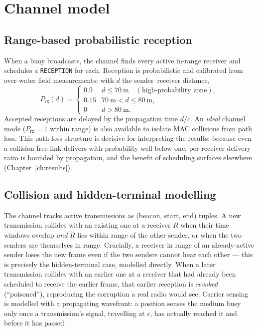 \documentclass[12pt,a4paper,oneside]{report}
\begin{document}
\section{Channel model}
\label{sec:collmodel}
\subsection{Range-based probabilistic reception}
When a buoy broadcasts, the channel finds every active in-range receiver and
schedules a \texttt{RECEPTION} for each. Reception is probabilistic and
calibrated from over-water field measurements: with $d$ the sender--receiver
distance,
\begin{equation}
  P_{\text{rx}}(d) =
  \begin{cases}
    0.9 & d \le \SI{70}{\metre} \quad(\text{high-probability zone}),\\
    0.15 & \SI{70}{\metre} < d \le \SI{80}{\metre},\\
    0 & d > \SI{80}{\metre}.
  \end{cases}
\end{equation}
Accepted receptions are delayed by the propagation time $d/c$. An \emph{ideal}
channel mode ($P_{\text{rx}}=1$ within range) is also available to isolate MAC
collisions from path loss. This path-loss structure is decisive for interpreting
the results: because even a collision-free link delivers with probability well
below one, per-receiver delivery ratio is bounded by propagation, and the
benefit of scheduling surfaces elsewhere (Chapter~\ref{ch:results}).

\subsection{Collision and hidden-terminal modelling}
The channel tracks active transmissions as (beacon, start, end) tuples. A new
transmission collides with an existing one at a receiver $R$ when their time
windows overlap \emph{and} $R$ lies within range of the other sender, or when
the two senders are themselves in range. Crucially, a receiver in range of an
already-active sender loses the new frame even if the two senders cannot hear
each other --- this is precisely the hidden-terminal case, modelled directly.
When a later transmission collides with an earlier one at a receiver that had
already been scheduled to receive the earlier frame, that earlier reception is
\emph{revoked} (``poisoned''), reproducing the corruption a real radio would
see. Carrier sensing is modelled with a propagating wavefront: a position senses
the medium busy only once a transmission's signal, travelling at $c$, has
actually reached it and before it has passed.
\end{document}
